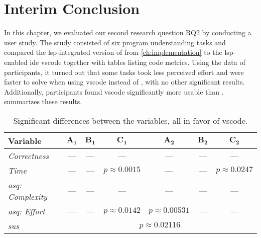 \documentclass[../thesis]{subfiles}
\begin{document}
\section{Interim Conclusion}
In this chapter, we evaluated our second research question \textsf{RQ2} by conducting a user study.
The study consisted of six program understanding tasks and compared the \gls{lsp}-integrated version of \SEE{} from \cref{ch:implementation} to the \gls{lsp}-enabled \gls{ide} \gls{vscode} together with tables listing code metrics.
Using the data of \participants participants, it turned out that some tasks took less perceived effort and were faster to solve when using \gls{vscode} instead of \SEE{}, with no other significant results.
Additionally, participants found \gls{vscode} significantly more usable than \SEE{}.
 summarizes these results.

\begin{table*}[htbp]
	\caption{Significant differences between the variables, all in favor of \gls{vscode}.}\label{tab:results}
	\centering
	\begin{tabular}{@{}lcccccc@{}}
		\toprule
		\textbf{Variable}            & $\bm{A_1}$                              & $\bm{B_1}$ & $ \bm{C_1}$        & $\bm{A_2}$          & $\bm{B_2}$ & $\bm{C_2}$         \\\midrule
		\emph{Correctness}           & ---                                     & ---        & ---                & ---                 & ---        & ---                \\
		\emph{Time}                  & ---                                     & ---        & $p \approx 0.0015$ & ---                 & ---        & $p \approx 0.0247$ \\
		\emph{\gls{asq}: Complexity} & ---                                     & ---        & ---                & ---                 & ---        & ---                \\
		\emph{\gls{asq}: Effort}     & ---                                     & ---        & $p \approx 0.0142$ & $p \approx 0.00531$ & ---        & ---                \\
		\emph{\gls{sus}}             & \multicolumn{6}{c}{$p \approx 0.02116$}                                                                                           \\
		\bottomrule
	\end{tabular}
\end{table*}
\end{document}
